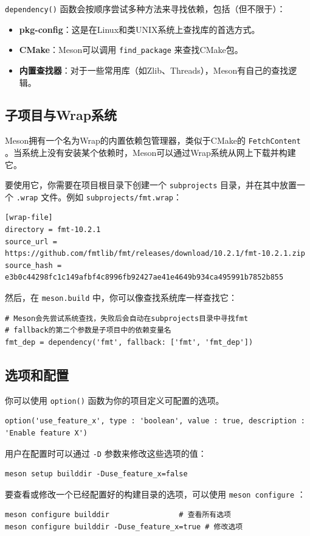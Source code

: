 \verb|dependency()|  函数会按顺序尝试多种方法来寻找依赖，包括（但不限于）：
\begin{itemize}
    \item \textbf{pkg-config}：这是在Linux和类UNIX系统上查找库的首选方式。
    \item \textbf{CMake}：Meson可以调用 \verb|find_package| 来查找CMake包。
    \item \textbf{内置查找器}：对于一些常用库（如Zlib、Threads），Meson有自己的查找逻辑。
\end{itemize}

\subsection{子项目与Wrap系统}
Meson拥有一个名为Wrap的内置依赖包管理器，类似于CMake的 \verb|FetchContent| 。当系统上没有安装某个依赖时，Meson可以通过Wrap系统从网上下载并构建它。

要使用它，你需要在项目根目录下创建一个 \verb|subprojects| 目录，并在其中放置一个 \verb|.wrap| 文件。例如 \verb|subprojects/fmt.wrap|：
\begin{verbatim}
[wrap-file]
directory = fmt-10.2.1
source_url = https://github.com/fmtlib/fmt/releases/download/10.2.1/fmt-10.2.1.zip
source_hash = e3b0c44298fc1c149afbf4c8996fb92427ae41e4649b934ca495991b7852b855
\end{verbatim}
然后，在 \verb|meson.build| 中，你可以像查找系统库一样查找它：
\begin{verbatim}
# Meson会先尝试系统查找，失败后会自动在subprojects目录中寻找fmt
# fallback的第二个参数是子项目中的依赖变量名
fmt_dep = dependency('fmt', fallback: ['fmt', 'fmt_dep'])
\end{verbatim}

\subsection{选项和配置}
你可以使用 \verb|option()| 函数为你的项目定义可配置的选项。
\begin{verbatim}
option('use_feature_x', type : 'boolean', value : true, description : 'Enable feature X')
\end{verbatim}
用户在配置时可以通过 \verb|-D| 参数来修改这些选项的值：
\begin{verbatim}
meson setup builddir -Duse_feature_x=false
\end{verbatim}
要查看或修改一个已经配置好的构建目录的选项，可以使用 \verb|meson configure| ：
\begin{verbatim}
meson configure builddir                # 查看所有选项
meson configure builddir -Duse_feature_x=true # 修改选项
\end{verbatim}

